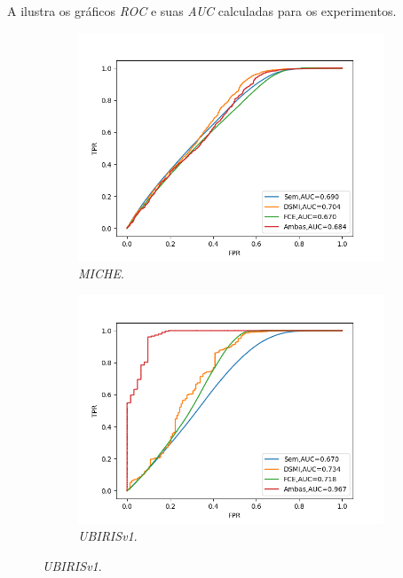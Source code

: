\noindent A  ilustra os gráficos \textit{\acrshort{ROC}} e suas \textit{\acrshort{AUC}} calculadas para os experimentos.

\begin{figure}[H]
    \centering %
\begin{subfigure}{0.5\textwidth}
  \includegraphics[width=\linewidth]{img/Resultados/miche_inter_distortion_auc.png}
  \caption{\textit{MICHE}.}
\end{subfigure}\hfil %
\begin{subfigure}{0.5\textwidth}
  \includegraphics[width=\linewidth]{img/Resultados/ubirisv1_inter_distortion_auc.png}
  \caption{\textit{UBIRISv1}.}
\end{subfigure}


\end{figure}
